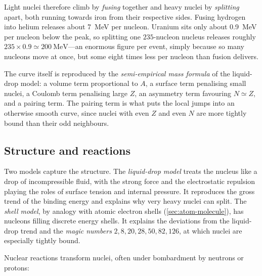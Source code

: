         Light nuclei therefore climb by \emph{fusing} together and heavy nuclei by \emph{splitting} apart, both running towards iron from their respective sides. Fusing hydrogen into helium releases about \qty{7}{\mega\electronvolt} per nucleon. Uranium sits only about \qty{0.9}{\mega\electronvolt} per nucleon below the peak, so splitting one $235$-nucleon nucleus releases roughly $235 \times 0.9 \simeq \qty{200}{\mega\electronvolt}$---an enormous figure per event, simply because so many nucleons move at once, but some eight times less per nucleon than fusion delivers.

        The curve itself is reproduced by the \emph{semi-empirical mass formula} of the liquid-drop model: a volume term proportional to $A$, a surface term penalising small nuclei, a Coulomb term penalising large $Z$, an asymmetry term favouring $N \simeq Z$, and a pairing term. The pairing term is what puts the local jumps into an otherwise smooth curve, since nuclei with even $Z$ and even $N$ are more tightly bound than their odd neighbours.

    \subsection{Structure and reactions}

        Two models capture the structure. The \emph{liquid-drop model} treats the nucleus like a drop of incompressible fluid, with the strong force and the electrostatic repulsion playing the roles of surface tension and internal pressure. It reproduces the gross trend of the binding energy and explains why very heavy nuclei can split. The \emph{shell model}, by analogy with atomic electron shells (\cref{sec:atom-molecule}), has nucleons filling discrete energy shells. It explains the deviations from the liquid-drop trend and the \emph{magic numbers} $2, 8, 20, 28, 50, 82, 126$, at which nuclei are especially tightly bound.

        Nuclear reactions transform nuclei, often under bombardment by neutrons or protons:

